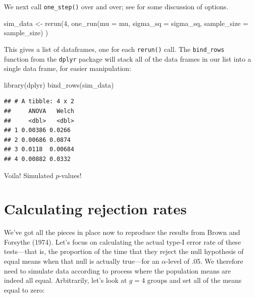 \documentclass[
]{book}
\newenvironment{Shaded}{\begin{snugshade}}{\end{snugshade}}
\newcommand{\AttributeTok}[1]{\textcolor[rgb]{0.77,0.63,0.00}{#1}}
\newcommand{\DecValTok}[1]{\textcolor[rgb]{0.00,0.00,0.81}{#1}}
\newcommand{\FunctionTok}[1]{\textcolor[rgb]{0.00,0.00,0.00}{#1}}
\newcommand{\NormalTok}[1]{#1}
\newcommand{\OtherTok}[1]{\textcolor[rgb]{0.56,0.35,0.01}{#1}}
\begin{document}
We next call \texttt{one\_step()} over and over; see \citet{repeating_oneself} for some discussion of options.

\begin{Shaded}
\begin{Highlighting}[]
\NormalTok{sim\_data }\OtherTok{\textless{}{-}} \FunctionTok{rerun}\NormalTok{(}\DecValTok{4}\NormalTok{,}
                  \FunctionTok{one\_run}\NormalTok{(}\AttributeTok{mu =}\NormalTok{ mu, }\AttributeTok{sigma\_sq =}\NormalTok{ sigma\_sq,}
                          \AttributeTok{sample\_size =}\NormalTok{ sample\_size) )}
\end{Highlighting}
\end{Shaded}

This gives a list of dataframes, one for each \texttt{rerun()} call.
The \texttt{bind\_rows} function from the \texttt{dplyr} package will stack all of the data frames in our list into a single data frame, for easier manipulation:

\begin{Shaded}
\begin{Highlighting}[]
\FunctionTok{library}\NormalTok{(dplyr)}
\FunctionTok{bind\_rows}\NormalTok{(sim\_data)}
\end{Highlighting}
\end{Shaded}

\begin{verbatim}
## # A tibble: 4 x 2
##     ANOVA   Welch
##     <dbl>   <dbl>
## 1 0.00386 0.0266 
## 2 0.00686 0.0874 
## 3 0.0118  0.00684
## 4 0.00882 0.0332
\end{verbatim}

Voila! Simulated \(p\)-values!

\hypertarget{calculating-rejection-rates}{%
\section{Calculating rejection rates}\label{calculating-rejection-rates}}

We've got all the pieces in place now to reproduce the results from Brown and Forsythe (1974). Let's focus on calculating the actual type-I error rate of these tests---that is, the proportion of the time that they reject the null hypothesis of equal means when that null is actually true---for an \(\alpha\)-level of .05. We therefore need to simulate data according to process where the population means are indeed all equal. Arbitrarily, let's look at \(g = 4\) groups and set all of the means equal to zero:
\end{document}
